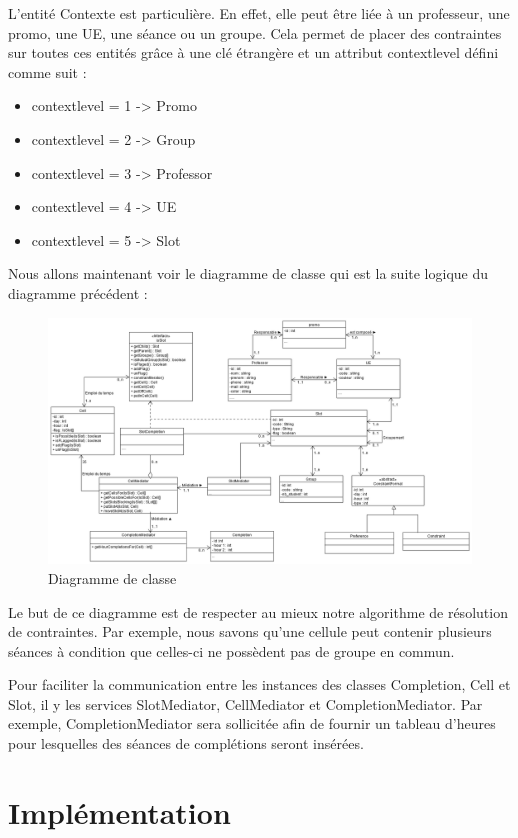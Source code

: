 \documentclass[12pt,a4paper,openany]{memoir}
\begin{document}
L'entité Contexte est particulière. En effet, elle peut être liée à un professeur, une promo, une UE, une séance ou un groupe. Cela permet de placer des contraintes sur toutes ces entités grâce à une clé étrangère et un attribut contextlevel défini comme suit : 
\begin{itemize}
    \item contextlevel = 1 -> Promo
    \item contextlevel = 2 -> Group
    \item contextlevel = 3 -> Professor
    \item contextlevel = 4 -> UE
    \item contextlevel = 5 -> Slot
\end{itemize}
\bigbreak
\par
Nous allons maintenant voir le diagramme de classe qui est la suite logique du diagramme précédent :
\begin{figure}[H]
    \includegraphics[width=20cm, center]{img/UML_class.png}
    \caption{Diagramme de classe}
\end{figure}
\par
Le but de ce diagramme est de respecter au mieux notre algorithme de résolution de contraintes. Par exemple, nous savons qu'une cellule peut contenir plusieurs séances à condition que celles-ci ne possèdent pas de groupe en commun. \par 
Pour faciliter la communication entre les instances des classes Completion, Cell et Slot, il y les services SlotMediator, CellMediator et CompletionMediator. Par exemple, CompletionMediator sera sollicitée afin de fournir un tableau d'heures pour lesquelles des séances de complétions seront insérées.

\clearpage

\chapter{Implémentation}
\end{document}
